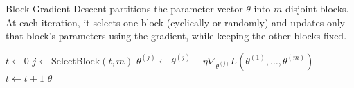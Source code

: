   \begin{algo}
    Block Gradient Descent partitions the parameter vector $\theta$ into $m$ disjoint blocks. At each iteration, it selects one block (cyclically or randomly) and updates only that block's parameters using the gradient, while keeping the other blocks fixed. 
    \begin{algorithm}[H]
    \label{alg:block_gd}
    \begin{algorithmic}[1]  %

        \State $t \gets 0$
          \State $j \gets \text{SelectBlock}(t, m)$ 
          \State $\theta^{(j)} \gets \theta^{(j)} - \eta \nabla_{\theta^{(j)}} L(\theta^{(1)}, \dots, \theta^{(m)})$
          \State $t \gets t + 1$
        \EndWhile
        \State \Return $\theta$
      \EndProcedure
    \end{algorithmic}
    \end{algorithm}
  \end{algo}

